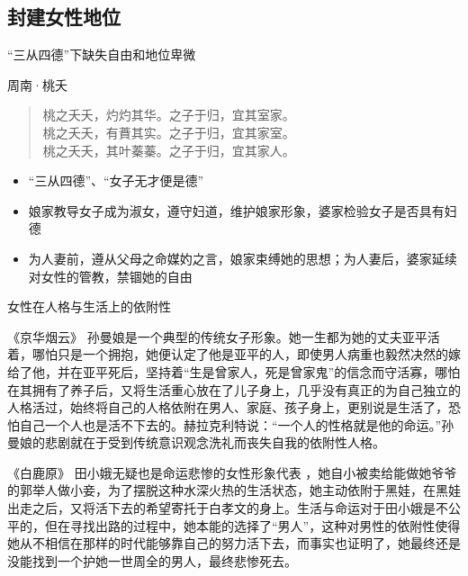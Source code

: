 \subsection{封建女性地位}
\begin{frame}{“三从四德”下缺失自由和地位卑微}
    \begin{block}{周南·桃夭}
        \begin{verse}
            桃之夭夭，灼灼其华。之子于归，宜其室家。 \\
            桃之夭夭，有蕡其实。之子于归，宜其家室。 \\
            桃之夭夭，其叶蓁蓁。之子于归，宜其家人。 \\
        \end{verse}
    \end{block}
    \begin{block}{}
        \begin{itemize}
            \item “三从四德”、“女子无才便是德”
            \item 娘家教导女子成为淑女，遵守妇道，维护娘家形象，婆家检验女子是否具有妇德
            \item 为人妻前，遵从父母之命媒妁之言，娘家束缚她的思想；为人妻后，婆家延续对女性的管教，禁锢她的自由
        \end{itemize}
    \end{block}
\end{frame}

\begin{frame}{女性在人格与生活上的依附性}
    \begin{block}{《京华烟云》}
        \small
        孙曼娘是一个典型的传统女子形象。她一生都为她的丈夫亚平活着，哪怕只是一个拥抱，她便认定了他是亚平的人，即使男人病重也毅然决然的嫁给了他，并在亚平死后，坚持着“生是曾家人，死是曾家鬼”的信念而守活寡，哪怕在其拥有了养子后，又将生活重心放在了儿子身上，几乎没有真正的为自己独立的人格活过，始终将自己的人格依附在男人、家庭、孩子身上，更别说是生活了，恐怕自己一个人也是活不下去的。赫拉克利特说：“一个人的性格就是他的命运。”孙曼娘的悲剧就在于受到传统意识观念洗礼而丧失自我的依附性人格。
    \end{block}
    \begin{block}{《白鹿原》}
        \small
        田小娥无疑也是命运悲惨的女性形象代表 ，她自小被卖给能做她爷爷的郭举人做小妾，为了摆脱这种水深火热的生活状态，她主动依附于黑娃，在黑娃出走之后，又将活下去的希望寄托于白孝文的身上。生活与命运对于田小娥是不公平的，但在寻找出路的过程中，她本能的选择了“男人”，这种对男性的依附性使得她从不相信在那样的时代能够靠自己的努力活下去，而事实也证明了，她最终还是没能找到一个护她一世周全的男人，最终悲惨死去。
    \end{block}
\end{frame}



